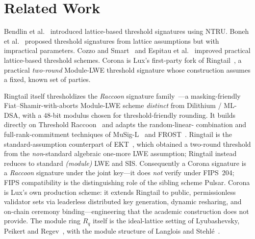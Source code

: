 \section{Related Work}

\label{sec:related}

Bendlin et al.~\cite{bendlin2013semi} introduced lattice-based threshold signatures
using NTRU. Boneh et al.~\cite{boneh2018threshold} proposed threshold signatures from
lattice assumptions but with impractical parameters. Cozzo and
Smart~\cite{cozzo2023sharing} and Espitau et al.~\cite{espitau2024fiat} improved
practical lattice-based threshold schemes. Corona is Lux's first-party fork of
Ringtail~\cite{ringtail}, a practical \emph{two-round} Module-LWE threshold signature
whose construction assumes a fixed, known set of parties.

Ringtail itself thresholdizes the \emph{Raccoon} signature family~\cite{raccoon}---a
masking-friendly Fiat--Shamir-with-aborts Module-LWE scheme \emph{distinct} from
Dilithium / ML-DSA, with a $48$-bit modulus chosen for threshold-friendly rounding. It
builds directly on Threshold Raccoon~\cite{traccoon} and adapts the random-linear-%
combination and full-rank-commitment techniques of MuSig-L~\cite{musigl} and
FROST~\cite{komlo2020frost}. Ringtail is the standard-assumption counterpart of
EKT~\cite{ekt}, which obtained a two-round threshold from the \emph{non}-standard
algebraic one-more LWE assumption; Ringtail instead reduces to standard \emph{(module)}
LWE and SIS. Consequently a Corona signature is a \emph{Raccoon} signature under the joint
key---it does \emph{not} verify under FIPS~204; FIPS compatibility is the distinguishing
role of the sibling scheme Pulsar. Corona is Lux's own production scheme: it extends
Ringtail to public, permissionless validator sets via leaderless distributed key
generation, dynamic resharing, and on-chain ceremony binding---engineering that the
academic construction does not provide. The module ring $R_q$ itself is the ideal-lattice
setting of Lyubashevsky, Peikert and Regev~\cite{lyubashevsky2010ideal}, with the module
structure of Langlois and Stehl\'e~\cite{langlois2015module}.

